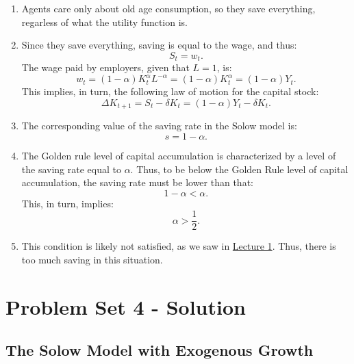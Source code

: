 \documentclass[]{book}
\theoremstyle{definition}
\theoremstyle{definition}
\theoremstyle{definition}
\theoremstyle{remark}
\begin{document}
\begin{enumerate}
\def\labelenumi{\arabic{enumi}.}
\item
  Agents care only about old age consumption, so they save everything,
  regarless of what the utility function is.
\item
  Since they save everything, saving is equal to the wage, and thus:
  \[S_t = w_t.\] The wage paid by employers, given that \(L=1\), is:
  \[w_{t}=(1-\alpha)K_{t}^{\alpha}L^{-\alpha}=(1-\alpha)K_{t}^{\alpha} = (1-\alpha)Y_t.\]
  This implies, in turn, the following law of motion for the capital
  stock:
  \[\Delta K_{t+1} = S_t - \delta K_t = (1-\alpha)Y_t-\delta K_t.\]
\item
  The corresponding value of the saving rate in the Solow model is:
  \[s = 1-\alpha.\]
\item
  The Golden rule level of capital accumulation is characterized by a
  level of the saving rate equal to \(\alpha\). Thus, to be below the
  Golden Rule level of capital accumulation, the saving rate must be
  lower than that: \[1-\alpha < \alpha.\] This, in turn, implies:
  \[\alpha > \frac{1}{2}.\]
\item
  This condition is likely not satisfied, as we saw in
  \protect\hyperlink{intro-cobb}{Lecture 1}. Thus, there is too much
  saving in this situation.
\end{enumerate}

\hypertarget{pset4-sol}{\chapter{Problem Set 4 -
Solution}\label{pset4-sol}}

\section{The Solow Model with Exogenous
Growth}\label{the-solow-model-with-exogenous-growth}
\end{document}
